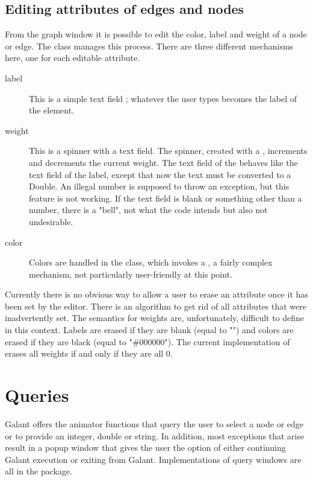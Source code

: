 \subsection{Editing attributes of edges and nodes}

From the graph window it is possible to edit the color, label and weight of a
node or edge.
The  class manages this process. There are three
different mechanisms here, one for each editable attribute.
\begin{description}
\item[label] This is a simple text field ; whatever the user
  types becomes the label of the element.
\item[weight] This is a spinner with a text field. The spinner, created with
  a , increments and decrements the current
  weight. The text field of the  behaves like the text field of
  the label, except that now the text must be converted to a Double.
  An illegal number is supposed to throw an exception, but this feature is
  not working. If the text field is blank or something other than a number,
  there is a "bell", not what the code intends but also not undesirable.
\item[color] Colors are handled in the  class, which invokes
  a , a fairly complex mechanism, not particularly
  user-friendly at this point.
\end{description}
Currently there is no obvious way to allow a user to erase an attribute once
it has been set by the editor. There is an algorithm 
to get rid of all attributes that were inadvertently set. The semantics for
weights are, unfortunately, difficult to define in this context. Labels are
erased if they are blank (equal to "") and colors are erased if they are black
(equal to "\#000000"). The current implementation of 
erases all weights if and only if they are all 0.

\section{Queries} \label{sec:queries}

Galant offers the animator functions that query the user to select a node or
edge or to provide an integer, double or string. In addition, most exceptions
that arise result in a popup window that gives the user the option of either
continuing Galant execution or exiting from Galant.
Implementations of query windows are all in the  package.

